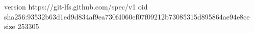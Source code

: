 version https://git-lfs.github.com/spec/v1
oid sha256:93532b63d1ed9d834af9ea730f4060ef07f09212b73085315d895864ae94e8ce
size 253305
